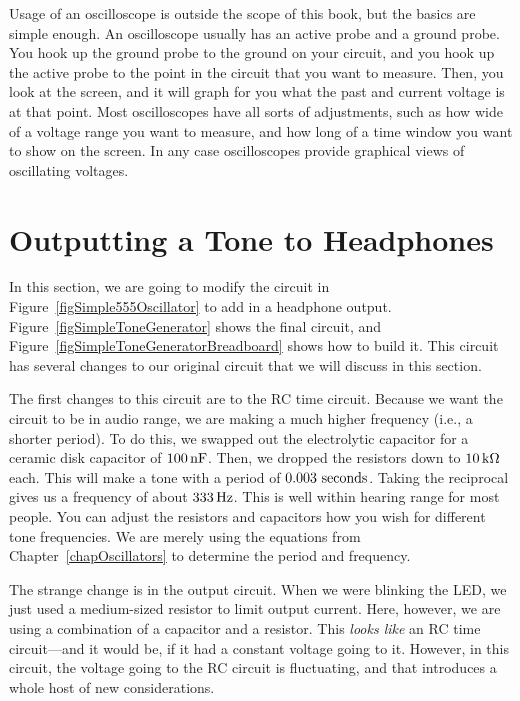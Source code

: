 Usage of an oscilloscope is outside the scope of this book, but the basics are simple enough.
An oscilloscope usually has an active probe and a ground probe.
You hook up the ground probe to the ground on your circuit, and you hook up the active probe to the point in the circuit that you want to measure.
Then, you look at the screen, and it will graph for you what the past and current voltage is at that point.
Most oscilloscopes have all sorts of adjustments, such as how wide of a voltage range you want to measure, and how long of a time window you want to show on the screen.
In any case oscilloscopes provide graphical views of oscillating voltages.

\section{Outputting a Tone to Headphones}

In this section, we are going to modify the circuit in Figure~\ref{figSimple555Oscillator} to add in a headphone output.
Figure~\ref{figSimpleToneGenerator} shows the final circuit, and Figure~\ref{figSimpleToneGeneratorBreadboard} shows how to build it.
This circuit has several changes to our original circuit that we will discuss in this section.



The first changes to this circuit are to the RC time circuit.
Because we want the circuit to be in audio range, we are making a much higher frequency (i.e., a shorter period).
To do this, we swapped out the electrolytic capacitor for a ceramic disk capacitor of $100\,\si{\nano\farad}$.  
Then, we dropped the resistors down to $10\,\si{\kilo\ohm}$ each.
This will make a tone with a period of $0.003\textrm{ seconds}$.
Taking the reciprocal gives us a frequency of about $333\,\si{\hertz}$.
This is well within hearing range for most people.
You can adjust the resistors and capacitors how you wish for different tone frequencies.
We are merely using the equations from Chapter~\ref{chapOscillators} to determine the period and frequency.

The strange change is in the output circuit.
When we were blinking the LED, we just used a medium-sized resistor to limit output current.
Here, however, we are using a combination of a capacitor and a resistor.
This \emph{looks like} an RC time circuit---and it would be, if it had a constant voltage going to it.
However, in this circuit, the voltage going to the RC circuit is fluctuating, and that introduces a whole host of new considerations.

